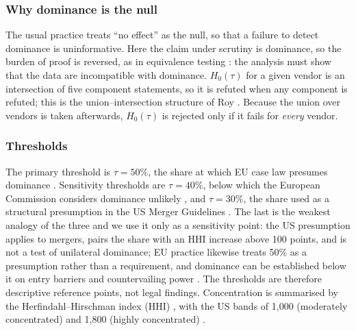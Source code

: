 \documentclass[11pt]{article}
\newcommand{\Hzero}{H_{0}}
\begin{document}
\subsubsection{Why dominance is the null} The usual practice treats ``no effect'' as the null, so that a failure to detect dominance is uninformative. Here the claim under scrutiny is dominance, so the burden of proof is reversed, as in equivalence testing \cite{lakens2017equivalence}: the analysis must show that the data are incompatible with dominance. $\Hzero(\tau)$ for a given vendor is an intersection of five component statements, so it is refuted when any component is refuted; this is the union--intersection structure of Roy \cite{roy1953heuristic}. Because the union over vendors is taken afterwards, $\Hzero(\tau)$ is rejected only if it fails for \emph{every} vendor.

\subsubsection{Thresholds} The primary threshold is $\tau=50\%$, the share at which EU case law presumes dominance \cite{akzo1991}. Sensitivity thresholds are $\tau=40\%$, below which the European Commission considers dominance unlikely \cite{ec2009guidance}, and $\tau=30\%$, the share used as a structural presumption in the US Merger Guidelines \cite{doj2023merger}. The last is the weakest analogy of the three and we use it only as a sensitivity point: the US presumption applies to mergers, pairs the share with an HHI increase above 100 points, and is not a test of unilateral dominance; EU practice likewise treats 50\% as a presumption rather than a requirement, and dominance can be established below it on entry barriers and countervailing power \cite{ec2009guidance}. The thresholds are therefore descriptive reference points, not legal findings. Concentration is summarised by the Herfindahl--Hirschman index (HHI) \cite{hirschman1964paternity,rhoades1993hhi}, with the US bands of 1{,}000 (moderately concentrated) and 1{,}800 (highly concentrated) \cite{doj2023merger}.
\end{document}
